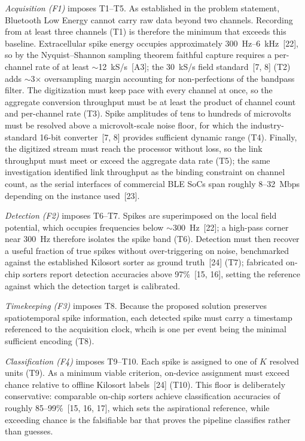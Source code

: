 \documentclass[11pt]{article}
\begin{document}
\emph{Acquisition (F1)} imposes T1--T5. As established in the problem statement, Bluetooth
Low Energy cannot carry raw data beyond two channels. Recording from at least three
channels (T1) is therefore the minimum that exceeds this baseline. Extracellular spike
energy occupies approximately 300~Hz--6~kHz~[22], so by the Nyquist--Shannon sampling
theorem faithful capture requires a per-channel rate of at least $\sim$12~kS/s~[A3]; the
30~kS/s field standard~[7, 8] (T2) adds $\sim$3$\times$ oversampling margin accounting for
non-perfections of the bandpass filter. The digitization must keep pace with every channel
at once, so the aggregate conversion throughput must be at least the product of channel
count and per-channel rate (T3). Spike amplitudes of tens to hundreds of microvolts must be
resolved above a microvolt-scale noise floor, for which the industry-standard 16-bit
converter~[7, 8] provides sufficient dynamic range (T4). Finally, the digitized stream must
reach the processor without loss, so the link throughput must meet or exceed the aggregate
data rate (T5); the same investigation identified link throughput as the binding constraint
on channel count, as the serial interfaces of commercial BLE SoCs span roughly 8--32~Mbps
depending on the instance used~[23].

\emph{Detection (F2)} imposes T6--T7. Spikes are superimposed on the local field potential,
which occupies frequencies below $\sim$300~Hz~[22]; a high-pass corner near 300~Hz
therefore isolates the spike band (T6). Detection must then recover a useful fraction of
true spikes without over-triggering on noise, benchmarked against the established Kilosort
sorter as ground truth~[24] (T7); fabricated on-chip sorters report detection accuracies
above 97\%~[15, 16], setting the reference against which the detection target is calibrated.

\emph{Timekeeping (F3)} imposes T8. Because the proposed solution preserves
spatiotemporal spike information, each detected spike must carry a timestamp referenced to
the acquisition clock, whcih is one per event being the minimal sufficient encoding (T8).

\emph{Classification (F4)} imposes T9--T10. Each spike is assigned to one of $K$ resolved
units (T9). As a minimum viable criterion, on-device assignment must exceed chance relative 
to offline Kilosort labels~[24] (T10). This floor is deliberately conservative: comparable 
on-chip sorters achieve classification accuracies of roughly 85--99\%~[15, 16, 17], which 
sets the aspirational reference, while exceeding chance is the falsifiable bar that proves 
the pipeline classifies rather than guesses.
\end{document}
